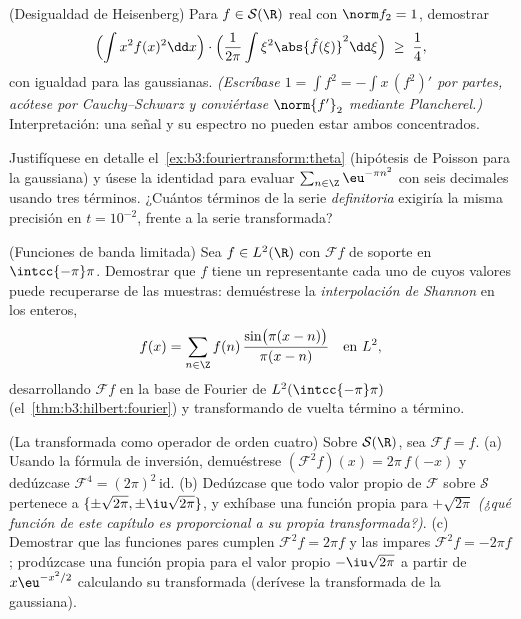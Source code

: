 \begin{exercise}[$\star\star\star$]\label{exo:b3:fouriertransform:8}
(Desigualdad de Heisenberg) Para $f \in \mathcal S(\R)$ real con
$\norm f_2 = 1$, demostrar
\[
\Bigl(\int x^2f(x)^2\dd x\Bigr)\cdot
\Bigl(\frac1{2\pi}\int \xi^2\abs{\hat f(\xi)}^2\dd\xi\Bigr)
\;\geq\; \frac14 ,
\]
con igualdad para las gaussianas. \emph{(Escríbase $1 = \int f^2 =
-\int x\,(f^2)'$ por partes, acótese por Cauchy--Schwarz y conviértase
$\norm{f'}_2$ mediante Plancherel.)} Interpretación: una señal y su
espectro no pueden estar ambos concentrados.
\end{exercise}

\begin{exercise}[$\star\star$]\label{exo:b3:fouriertransform:9}
Justifíquese en detalle el~\cref{ex:b3:fouriertransform:theta}
(hipótesis de Poisson para la gaussiana) y úsese la identidad para
evaluar $\sum_{n\in\Z}\eu^{-\pi n^2}$ con seis decimales usando tres
términos. ¿Cuántos términos de la serie \emph{definitoria} exigiría la
misma precisión en $t = 10^{-2}$, frente a la serie transformada?
\end{exercise}

\begin{exercise}[$\star\star$]\label{exo:b3:fouriertransform:10}
(Funciones de banda limitada) Sea $f \in L^2(\R)$ con $\mathcal Ff$ de
soporte en $\intcc{-\pi}\pi$. Demostrar que $f$ tiene un representante
cada uno de cuyos valores puede recuperarse de las muestras: demuéstrese
la \emph{interpolación de Shannon} en los enteros,
\[
f(x) = \sum_{n\in\Z} f(n)\,
\frac{\sin\bigl(\pi(x - n)\bigr)}{\pi(x - n)}
\quad\text{en } L^2,
\]
desarrollando $\mathcal Ff$ en la base de Fourier de
$L^2(\intcc{-\pi}\pi)$ (el~\cref{thm:b3:hilbert:fourier}) y
transformando de vuelta término a término.
\end{exercise}

\begin{exercise}[$\star\star$]\label{exo:b3:fouriertransform:11}
(La transformada como operador de orden cuatro) Sobre $\mathcal
S(\R)$, sea $\mathcal F f = \hat f$. (a) Usando la fórmula de inversión,
demuéstrese $(\mathcal F^2f)(x) =
2\pi\,f(-x)$ y dedúzcase $\mathcal F^4 = (2\pi)^2\,
\mathrm{id}$. (b) Dedúzcase que todo valor propio de $\mathcal F$ sobre
$\mathcal S$ pertenece a $\{\pm\sqrt{2\pi},
\pm\iu\sqrt{2\pi}\}$, y exhíbase una función propia para $+\sqrt{2\pi}$
\emph{(¿qué función de este capítulo es proporcional a su propia
transformada?)}. (c) Demostrar que las funciones pares cumplen
$\mathcal F^2f = 2\pi
f$ y las impares $\mathcal F^2f = -2\pi f$; prodúzcase una función
propia para el valor propio $-\iu\sqrt{2\pi}$ a partir de
$x\eu^{-x^2/2}$ calculando su transformada (derívese la transformada de
la gaussiana).
\end{exercise}

